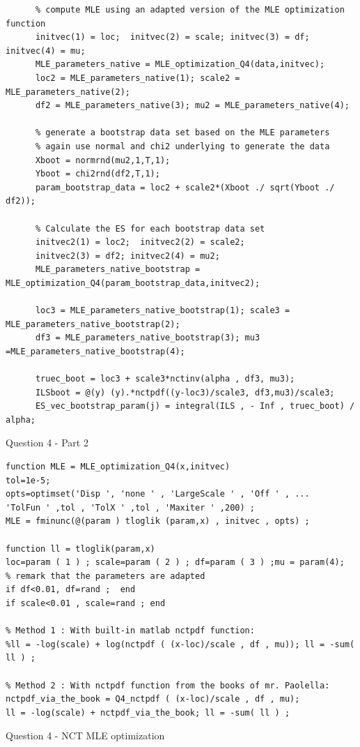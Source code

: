 \documentclass[12pt]{article}
\begin{document}
\begin{Program}[!htb]
\begin{lstlisting}[style=Matlab-editor,basicstyle=\mlttfamily\footnotesize]
%% Question 4 - Part 2 ---------------------------------------------------
      % compute MLE using an adapted version of the MLE optimization function
      initvec(1) = loc;  initvec(2) = scale; initvec(3) = df; initvec(4) = mu;
      MLE_parameters_native = MLE_optimization_Q4(data,initvec);
      loc2 = MLE_parameters_native(1); scale2 = MLE_parameters_native(2); 
      df2 = MLE_parameters_native(3); mu2 = MLE_parameters_native(4);
      
      % generate a bootstrap data set based on the MLE parameters 
      % again use normal and chi2 underlying to generate the data
      Xboot = normrnd(mu2,1,T,1); 
      Yboot = chi2rnd(df2,T,1);
      param_bootstrap_data = loc2 + scale2*(Xboot ./ sqrt(Yboot ./ df2)); 
      
      % Calculate the ES for each bootstrap data set 
      initvec2(1) = loc2;  initvec2(2) = scale2; 
      initvec2(3) = df2; initvec2(4) = mu2;
      MLE_parameters_native_bootstrap = MLE_optimization_Q4(param_bootstrap_data,initvec2);
      
      loc3 = MLE_parameters_native_bootstrap(1); scale3 = MLE_parameters_native_bootstrap(2); 
      df3 = MLE_parameters_native_bootstrap(3); mu3 =MLE_parameters_native_bootstrap(4);
     
      truec_boot = loc3 + scale3*nctinv(alpha , df3, mu3);
      ILSboot = @(y) (y).*nctpdf((y-loc3)/scale3, df3,mu3)/scale3; 
      ES_vec_bootstrap_param(j) = integral(ILS , - Inf , truec_boot) / alpha;    

\end{lstlisting}
\caption{Question 4 - Part 2}
\label{Question 4 - Part 2}
\end{Program}

\begin{Program}[!htb]
\begin{lstlisting}[style=Matlab-editor,basicstyle=\mlttfamily\footnotesize]
%% Question 4 - NCT MLE optimization -----------------------------------
function MLE = MLE_optimization_Q4(x,initvec)
tol=1e-5;
opts=optimset('Disp ', 'none ' , 'LargeScale ' , 'Off ' , ...
'TolFun ' ,tol , 'TolX ' ,tol , 'Maxiter ' ,200) ;
MLE = fminunc(@(param ) tloglik (param,x) , initvec , opts) ;

function ll = tloglik(param,x)
loc=param ( 1 ) ; scale=param ( 2 ) ; df=param ( 3 ) ;mu = param(4);
% remark that the parameters are adapted 
if df<0.01, df=rand ;  end 
if scale<0.01 , scale=rand ; end 

% Method 1 : With built-in matlab nctpdf function:
%ll = -log(scale) + log(nctpdf ( (x-loc)/scale , df , mu)); ll = -sum( ll ) ; 

% Method 2 : With nctpdf function from the books of mr. Paolella:
nctpdf_via_the_book = Q4_nctpdf ( (x-loc)/scale , df , mu);
ll = -log(scale) + nctpdf_via_the_book; ll = -sum( ll ) ;

\end{lstlisting}
\caption{Question 4 - NCT MLE optimization}
\label{Question 4 - NCT MLE optimization}
\end{Program}
\newpage
\end{document}
